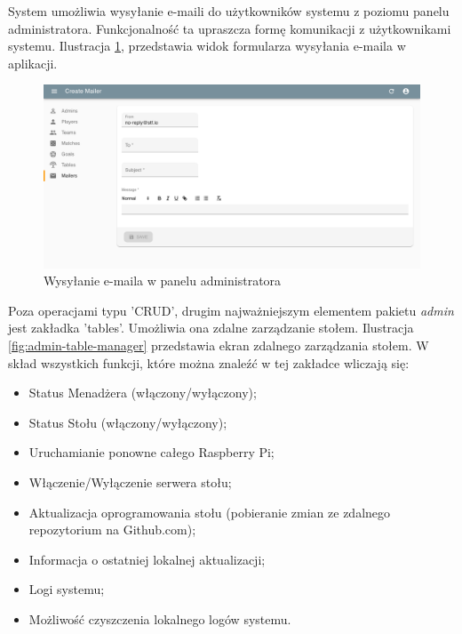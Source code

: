 \newpage

System umożliwia wysyłanie e-maili do użytkowników systemu z poziomu panelu administratora. Funkcjonalność ta upraszcza formę komunikacji z użytkownikami systemu. Ilustracja \ref{fig:admin-send-mail}, przedstawia widok formularza wysyłania e-maila w aplikacji.

\begin{figure}[h!]
  \centering
    \includegraphics[width=\textwidth]{images/admin/mailer.png}
  \caption{Wysyłanie e-maila w panelu administratora}
  \label{fig:admin-send-mail}
\end{figure}

Poza operacjami typu 'CRUD', drugim najważniejszym elementem pakietu \textit{admin} jest zakładka 'tables'. Umożliwia ona zdalne zarządzanie stołem. Ilustracja \ref{fig:admin-table-manager} przedstawia ekran zdalnego zarządzania stołem. W skład wszystkich funkcji, które można znaleźć w tej zakładce wliczają się:

\begin{itemize}
	\item Status Menadżera (włączony/wyłączony);
	\item Status Stołu (włączony/wyłączony);
	\item Uruchamianie ponowne całego Raspberry Pi;
	\item Włączenie/Wyłączenie serwera stołu;
	\item Aktualizacja oprogramowania stołu (pobieranie zmian ze zdalnego repozytorium na Github.com);
	\item Informacja o ostatniej lokalnej aktualizacji;
	\item Logi systemu;
	\item Możliwość czyszczenia lokalnego logów systemu.
\end{itemize}

